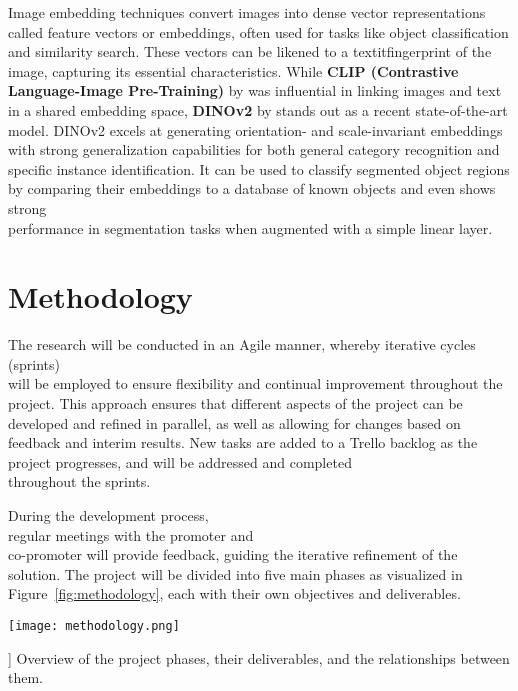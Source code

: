 \documentclass[english]{hogent-article}
\begin{document}
Image embedding techniques convert images into dense vector representations called feature vectors or embeddings, 
often used for tasks like object classification and similarity search.
These vectors can be likened to a textit{fingerprint} of the image, capturing its essential characteristics.
While \textbf{CLIP (Contrastive Language-Image Pre-Training)} by \textcite{Radford2021} was influential in linking images and text in a shared embedding space,
\textbf{DINOv2} by \textcite{Oquab2024} stands out as a recent state-of-the-art model. 
DINOv2 excels at generating orientation- and scale-invariant embeddings with strong generalization capabilities 
for both general category recognition and specific instance identification. 
It can be used to classify segmented object regions by comparing their embeddings to a database of 
known objects and even shows strong\\ performance in segmentation tasks when augmented with a simple linear layer.

\section{Methodology}
\label{sec:methodology}

The research will be conducted in an Agile manner, whereby iterative cycles (sprints)\\ will be employed 
to ensure flexibility and continual improvement throughout the project.
This approach ensures that different aspects of the project can be developed and refined in parallel, 
as well as allowing for changes based on feedback and interim results.
New tasks are added to a Trello backlog as the project progresses, and will be addressed and completed\\ throughout the sprints.

During the development process,\\ regular meetings with the promoter and\\ co-promoter will provide feedback, guiding the iterative refinement of the solution.
The project will be divided into five main phases as visualized in Figure~\ref{fig:methodology}, each with their own objectives and deliverables.

\begin{figure*}
  \centering
  \texttt{[image: methodology.png]}
  \caption[
    
  ]{\label{fig:methodology}
    Overview of the project phases, their deliverables, and the relationships between them.
  }
\end{figure*}
\end{document}
